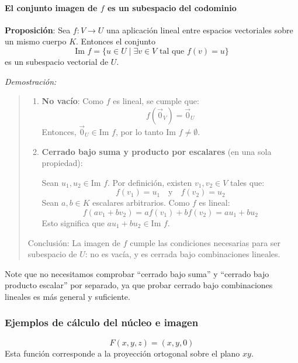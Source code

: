 \paragraph{El conjunto imagen de \(f\) es un subespacio del codominio}


\textbf{Proposición}: Sea \(f: V \to U\) una aplicación lineal entre espacios vectoriales sobre un mismo cuerpo \(K\). Entonces el conjunto
\[
\text{Im } f = \{ u \in U \mid \exists v \in V \text{ tal que } f(v) = u \}
\]
es un subespacio vectorial de \(U\).

\textit{Demostración:}
\begin{quote}
  \begin{enumerate}
    \item \textbf{No vacío}:
      Como \(f\) es lineal, se cumple que:
      \[
      f(\vec{0}_V) = \vec{0}_U
      \]
      Entonces, \(\vec{0}_U \in \text{Im } f\), por lo tanto \(\text{Im } f \ne \emptyset\).

    \item \textbf{Cerrado bajo suma y producto por escalares} (en una sola propiedad):

      Sean \(u_1, u_2 \in \text{Im } f\).
      Por definición, existen \(v_1, v_2 \in V\) tales que:
      \[
      f(v_1) = u_1 \quad \text{y} \quad f(v_2) = u_2
      \]
      Sean \(a, b \in K\) escalares arbitrarios. Como \(f\) es lineal:
      \[
      f(a v_1 + b v_2) = a f(v_1) + b f(v_2) = a u_1 + b u_2
      \]
      Esto significa que \(a u_1 + b u_2 \in \text{Im } f\).
  \end{enumerate}

  Conclusión: La imagen de \(f\) cumple las condiciones necesarias para ser subespacio de \(U\): no es vacía, y es cerrada bajo combinaciones lineales.
\end{quote}

\begin{tcolorbox}[title=Observaciones]
  Note que no necesitamos comprobar ``cerrado bajo suma'' y ``cerrado bajo producto escalar'' por separado, ya que probar cerrado bajo combinaciones lineales es más general y suficiente.
\end{tcolorbox}

\subsubsection{Ejemplos de cálculo del núcleo e imagen}

\label{ej:aplicacion_proyeccion_xy}
\[
F(x,y,z) = (x,y,0)
\]
Esta función corresponde a la proyección ortogonal sobre el plano \(xy\).

